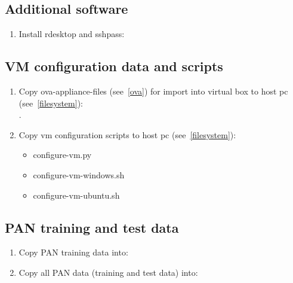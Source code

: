\subsection{Additional software}
\begin{enumerate}
\item Install rdesktop and sshpass:\\
\end{enumerate}

\subsection{VM configuration data and scripts}
\begin{enumerate}
\item Copy ova-appliance-files (see~\ref{ova}) for import into virtual box to host pc (see~\ref{filesystem}):\\
.
\item Copy vm configuration scripts to host pc (see~\ref{filesystem}):\\
\begin{itemize}
	\item configure-vm.py
	\item configure-vm-windows.sh
	\item configure-vm-ubuntu.sh
\end{itemize}
\end{enumerate}

\subsection{PAN training and test data}
\begin{enumerate}
\item Copy PAN training data into:\\
\item Copy all PAN data (training and test data) into:\\
\end{enumerate}

